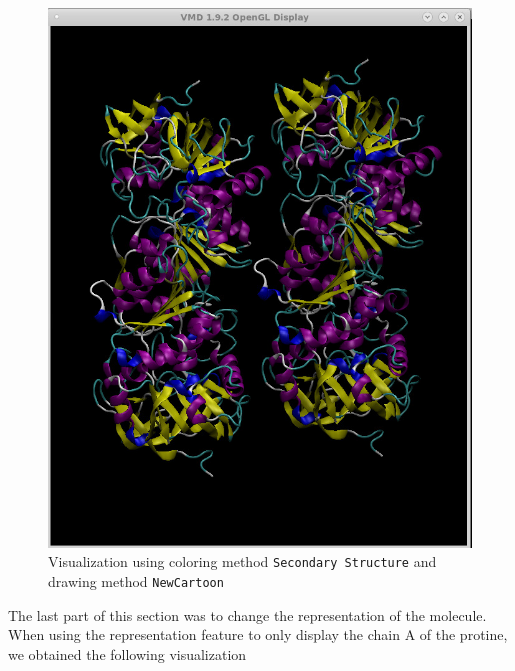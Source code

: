 \documentclass[11pt]{article}
\makeatletter
\def\maxwidth{\ifdim\Gin@nat@width>\linewidth\linewidth
    \else\Gin@nat@width\fi}
\let\Oldincludegraphics\includegraphics
\renewcommand{\includegraphics}[1]{\Oldincludegraphics[width=.8\maxwidth]{#1}}
\makeatother
\begin{document}
\begin{figure}
\centering
\includegraphics{Screenshot_ladh_new_vis.png}
\caption{Visualization using coloring method
\texttt{Secondary\ Structure} and drawing method \texttt{NewCartoon}}
\end{figure}

The last part of this section was to change the representation of the
molecule. When using the representation feature to only display the
chain A of the protine, we obtained the following visualization
\end{document}
